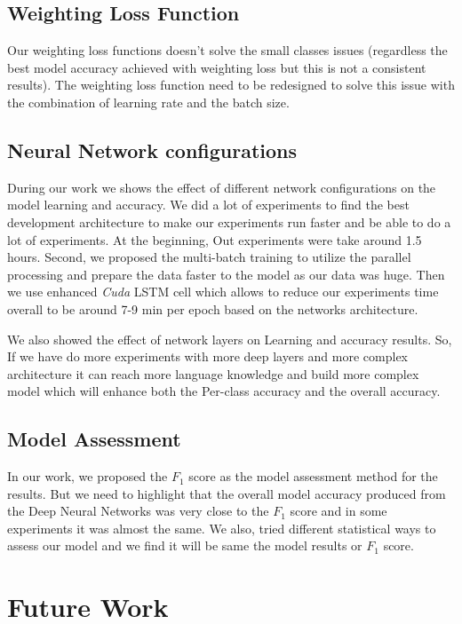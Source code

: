 \subsection{Weighting Loss Function}

Our weighting loss functions doesn't solve the small classes issues (regardless the best model accuracy achieved with weighting loss but this is not a consistent results). The weighting loss function need to be redesigned to solve this issue with the combination of learning rate and the batch size.


\subsection{Neural Network configurations}

During our work we shows the effect of different network configurations on the model learning and accuracy. We did a lot of experiments to find the best development architecture to make our experiments run faster and be able to do a lot of experiments. At the beginning, Out experiments were take around 1.5 hours. Second, we proposed the multi-batch training to utilize the parallel processing and prepare the data faster to the model as our data was huge. Then we use enhanced \textit{Cuda} LSTM cell which allows to reduce our experiments time overall to be around 7-9 min per epoch based on the networks architecture. 

We also showed the effect of network layers on Learning and accuracy results. So, If we have do more experiments with more deep layers and more complex architecture it can reach more language knowledge and build more complex model which will enhance both the Per-class accuracy and the overall accuracy.

\subsection{Model Assessment}

In our work, we proposed the $F_1$ score as the model assessment method for the results. But we need to highlight that the overall model accuracy produced from the Deep Neural Networks was very close to the $F_1$ score and in some experiments it was almost the same. We also, tried different statistical ways to assess our model and we find it will be same the model results or $F_1$ score.

  \section{Future Work}

